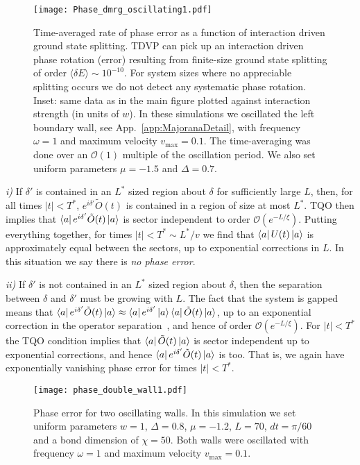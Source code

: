\documentclass[aps,pra,floatfix,footinbib,longbibliography,twocolumn,superscriptaddress, preprintnumbers, nobibnotes]{revtex4-1}
\begin{document}
 \begin{figure}
    \centering
    \texttt{[image: Phase\_dmrg\_oscillating1.pdf]}
    \caption{Time-averaged rate of phase error as a function of interaction driven ground state splitting. TDVP can pick up an interaction driven phase rotation (error) resulting from finite-size ground state splitting of order $\langle \delta E \rangle \sim 10^{-10}$. For system sizes where no appreciable splitting occurs we do not detect any systematic phase rotation. Inset: same data as in the main figure plotted against interaction strength (in units of $w$). In these simulations we oscillated the left boundary wall, see App.~\ref{app:MajoranaDetail}, with frequency $\omega = 1$ and maximum velocity $v_{\text{max}} = 0.1$. The time-averaging was done over an $\mathcal{O}(1)$ multiple of the oscillation period. We also set uniform parameters $\mu = -1.5$ and $\Delta = 0.7$. }
    \label{fig:phase_dmrg_oscillating}
\end{figure}
\vspace{1mm}
\noindent \textit{i)} If $\delta'$ is contained in an $L^*$ sized region about $\delta$ for sufficiently large $L$, then, for all times $|t| < T^*$, $e^{i\delta'}\tilde{O}(t)$ is contained in a region of size at most $L^*$. TQO then implies that $\left\langle a\right|e^{i\delta'}\tilde{O}(t)\left|a\right\rangle$ is sector independent to order $\mathcal{O}(e^{-L/\xi})$. Putting everything together, for times $|t| < T^*\sim L^*/v$ we find that $\left\langle a\right|U(t)\left|a\right\rangle$ is approximately equal between the sectors, up to exponential corrections in $L$. In this situation we say there is \emph{no phase error}.
\vspace{1mm}

\noindent \textit{ii)} If $\delta'$ is not contained in an $L^*$ sized region about $\delta$, then the separation between $\delta$ and $\delta'$ must be growing with $L$. The fact that the system is gapped means that $\left\langle a\right| e^{i\delta'}  \tilde{O}(t) \left|a\right\rangle \approx \left\langle a\right| e^{i\delta'} \left|a\right\rangle\left\langle a\right|  \tilde{O}(t) \left|a\right\rangle$, up to an exponential correction in the operator separation~\citep{Hastings_2004,Hastings:2005pr}, and hence of order $\mathcal{O}(e^{-L/\xi})$. For $|t| < T^*$ the TQO condition implies that $\left\langle a\right|  \tilde{O}(t) \left|a\right\rangle$ is sector independent up to exponential corrections, and hence $\left\langle a\right|e^{i\delta'}  \tilde{O}(t) \left|a\right\rangle$ is too. That is, we again have exponentially vanishing phase error for times $|t| < T^*$. 
\vspace{1mm}

 \begin{figure}
    \centering
    \texttt{[image: phase\_double\_wall1.pdf]}
    \caption{Phase error for two oscillating walls. In this simulation we set uniform parameters $w = 1$, $\Delta = 0.8$, $\mu = -1.2$, $L = 70$,  $dt= \pi/60$ and a bond dimension of $\chi = 50$.  Both walls were oscillated with frequency $\omega = 1$ and  maximum velocity $v_{\text{max}} = 0.1$. }
    \label{fig:phase_dmrg_oscillating2}
\end{figure}
\end{document}
